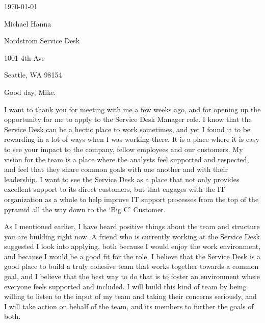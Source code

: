 \documentclass[10pt,oneside]{article}
\begin{document}
\hfill\dte\today
\heading
\vspace{\baselineskip}

Michael Hanna

Nordstrom Service Desk

1001 4th Ave

Seattle, WA  98154

\vspace{\baselineskip}
\vspace{\baselineskip}

Good day, Mike.

\vspace{\baselineskip}

I want to thank you for meeting with me a few weeks ago, and for opening up the opportunity for me to apply to the Service Desk Manager role. I know that the Service Desk can be a hectic place to work sometimes, and yet I found it to be rewarding in a lot of ways when I was working there. It is a place where it is easy to see your impact to the company, fellow employees and our customers. My vision for the team is a place where the analysts feel supported and respected, and feel that they share common goals with one another and with their leadership. I want to see the Service Desk as a place that not only provides excellent support to its direct customers, but that engages with the IT organization as a whole to help improve IT support processes from the top of the pyramid all the way down to the ‘Big C’ Customer.

\vspace{\baselineskip}

As I mentioned earlier, I have heard positive things about the team and structure you are building right now. A friend who is currently working at the Service Desk suggested I look into applying, both because I would enjoy the work environment, and because I would be a good fit for the role. I believe that the Service Desk is  a good place to build a truly cohesive team that works together towards a common goal, and I believe that the best way to do that is to foster an environment where everyone feels supported and included. I will build this kind of team by being willing to listen to the input of my team and taking their concerns seriously, and I will take action on behalf of the team, and its members to further the goals of both.

\vspace{\baselineskip}
\end{document}
